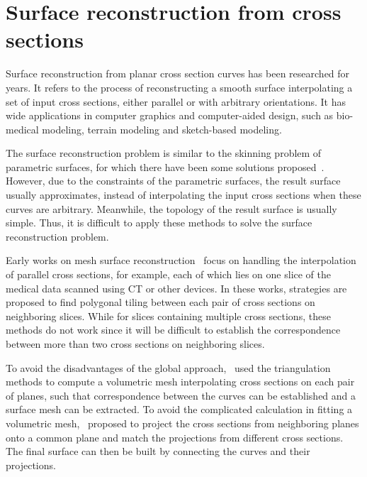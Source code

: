 \section{Surface reconstruction from cross sections}\label{ch2:sec:surfreconst}

Surface reconstruction  from planar cross section curves has been
researched for years. It refers to the process of reconstructing a
smooth surface interpolating a set of input cross sections, either
parallel or with arbitrary orientations. It has wide applications in
computer graphics and computer-aided design, such as bio-medical
modeling, terrain modeling and sketch-based modeling.

The surface reconstruction problem is similar to the skinning problem
of parametric surfaces, for which there have been some solutions
proposed~\cite{NAH03,SWZ04,HL07}. However, due to the constraints of the
parametric surfaces, the result surface usually approximates, instead of
interpolating the input cross sections when these curves are arbitrary.
Meanwhile, the topology of the result surface is usually simple.
Thus, it is difficult to apply these methods to solve the surface reconstruction problem.

Early  works on mesh surface reconstruction~\cite{KE75, FKU77,
CS78, Kd82, GD82, WA86} focus on handling the interpolation of
parallel cross sections, for example, each of which lies on one
slice of the medical data scanned using CT or other devices. In
these works, strategies are proposed to find polygonal tiling
between each pair of cross sections on neighboring slices. While
for slices containing multiple cross sections, these methods do not
work since it will be difficult to establish the correspondence
between more than two cross sections on neighboring slices.

To avoid the  disadvantages of the global approach,~\cite{BJ88,
MSS92, GB93, FL98, CD99} used the triangulation methods to compute
a volumetric mesh interpolating cross sections on each pair of
planes, such that correspondence between the curves can be
established and a surface mesh can be extracted. To avoid the
complicated calculation in fitting a volumetric
mesh,~\cite{BS96,BCL96,OPC96,KSS00,BGLS04,JWCET05,BV07} proposed to
project the cross sections from neighboring planes onto a common
plane and match the projections from different cross sections. The
final surface can then be built by connecting the curves and their
projections.

